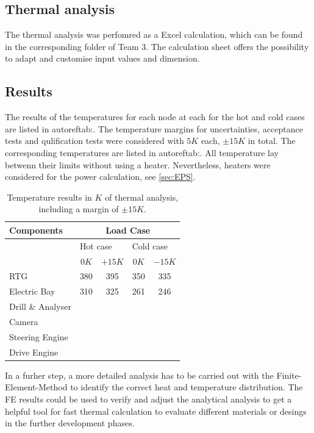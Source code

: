 \subsection{Thermal analysis}
The thermal analysis was perfomred as a Excel calculation, which can be found in the corresponding folder of Team 3.
The calculation sheet offers the possibility to adapt and customise input values and dimension.

\subsection{Results}

The results of the temperatures for each node at each for the hot and cold cases  are listed in autoref{tab:}.
The temperature margins for uncertainties, acceptance tests and qulification tests were considered with $5 K$ each, $\pm 15K$ in total.
The corresponding temperatures are listed in autoref{tab:}.
All temperature lay betwenn their limits without using a heater.
Nevertheless, heaters were considered for the power calculation, see \autoref{sec:EPS}.

\begin{table}[htb]
	\centering
	\begin{tabular}{l@{\qquad}cc@{\qquad}|@{\qquad}cc}
		\hline
		Components & \multicolumn{4}{c}{Load Case}   \\ \hline
		 & \multicolumn{2}{l}{Hot case} & \multicolumn{2}{l}{Cold case} \\
		 & $0K$ & $+15 K$ & $0K$ & $-15 K$ \\ \hline
		RTG  & 380 & 395 & 350 & 335   \\
		Electric Bay & 310 & 325 & 261 & 246  \\
		Drill \& Analyser & & & &  \\
		Camera & & & &  \\
		Steering Engine & & & &  \\
		Drive Engine & & & &  \\   \hline
	\end{tabular}
	\caption{Temperature results in $K$ of thermal analysis, including a margin of $\pm15K$.}
	\label{tab:tcs_temp}
\end{table}

In a furher step, a more detailed analysis has to be carried out with the Finite-Element-Method to identify the correct heat and temperature distribution.
The FE results could be used to verify and adjust the analytical analysis to get a helpful tool for fast thermal calculation to evaluate different materials or desings in the further development phases.

